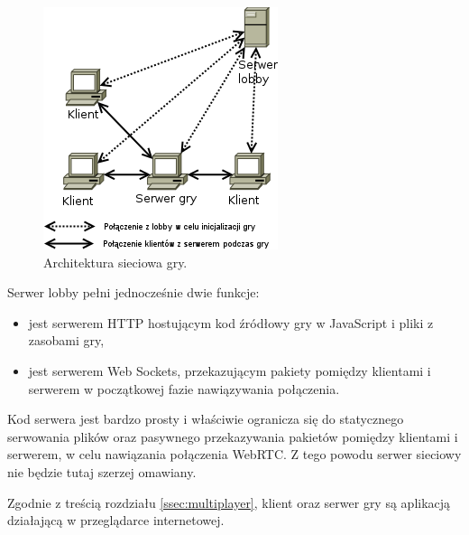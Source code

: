\begin{figure}[h]
  \centering
  \includegraphics[scale=1]{zasoby/rozdzial2/multiplayer}  
  \caption{Architektura sieciowa gry.}
  \label{fig:multiplayer}
\end{figure}

Serwer lobby pełni jednocześnie dwie funkcje:
\begin{itemize}
\item jest serwerem HTTP hostującym kod źródłowy gry w JavaScript i pliki z
  zasobami gry,
\item jest serwerem Web Sockets, przekazującym pakiety pomiędzy klientami
  i serwerem w początkowej fazie nawiązywania połączenia.
\end{itemize}

Kod serwera jest bardzo prosty i właściwie ogranicza się do statycznego
serwowania plików oraz pasywnego przekazywania pakietów pomiędzy klientami
i serwerem, w celu nawiązania połączenia WebRTC. Z tego powodu serwer
sieciowy nie będzie tutaj szerzej omawiany.

Zgodnie z treścią rozdziału \ref{ssec:multiplayer}, klient oraz serwer gry
są aplikacją działającą w przeglądarce internetowej.



